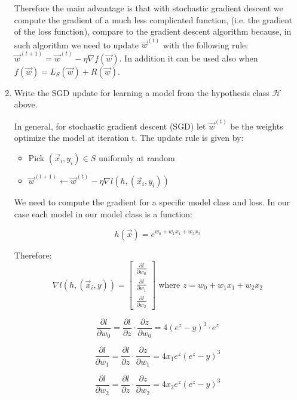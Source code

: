 \documentclass[a4paper,11pt,oneside]{book}
\begin{document}
\begin{enumerate}
\begin{solution}
        Therefore the main advantage is that with stochastic gradient descent we compute the gradient of a much less complicated function, (i.e. the gradient of the loss function), compare to the gradient descent algorithm because, in such algorithm we need to update $\vec{w}^{(t)}$ with the following rule:
        $\vec{w}^{(t+1)} = \vec{w}^{(t)} - \eta\nabla f(\vec{w})$. In addition it can be used also when $f(\vec{w}) = L_S(\vec{w}) + R(\vec{w})$.
    \end{solution}
\item Write the SGD update for learning a model from the hypothesis class $\mathcal{H}$ above.
    \begin{solution}
        In general, for stochastic gradient descent (SGD) let $\vec{w}^{(t)}$ be the weights optimize the model at iteration t. The update rule is given by:
        
        \begin{itemize}
        \item Pick $(\vec{x}_i,y_i) \in S$ uniformly at random
        \item $\vec{w}^{(t+1)} \leftarrow \vec{w}^{(t)} - \eta \nabla l(h,(\vec{x}_i,y_i))$
        \end{itemize}
        
        We need to compute the gradient for a specific model class and loss. In our case each model in our model class is a function:
        
        $$h(\vec{x}) = e^{w_0 + w_1x_1 + w_2x_2}$$
        
        Therefore:
        $$\nabla l(h,(\vec{x}_i,y)) = \begin{bmatrix}
        \frac{\partial l}{\partial w_0} \\
        \frac{\partial l}{\partial w_1} \\
        \frac{\partial l}{\partial w_2}
        \end{bmatrix} \text{ where } z = w_0 + w_1x_1 + w_2x_2$$
        
        $$\frac{\partial l}{\partial w_0} = \frac{\partial l}{\partial z} \cdot \frac{\partial z}{\partial w_0} = 4(e^z-y)^3 \cdot e^z$$
        
        $$\frac{\partial l}{\partial w_1} = \frac{\partial l}{\partial z} \cdot \frac{\partial z}{\partial w_1} = 4x_1e^z(e^z-y)^3$$
        
        $$\frac{\partial l}{\partial w_2} = \frac{\partial l}{\partial z} \cdot \frac{\partial z}{\partial w_2} = 4x_2e^z(e^z-y)^3$$
        

\end{solution}
\end{enumerate}
\end{document}
